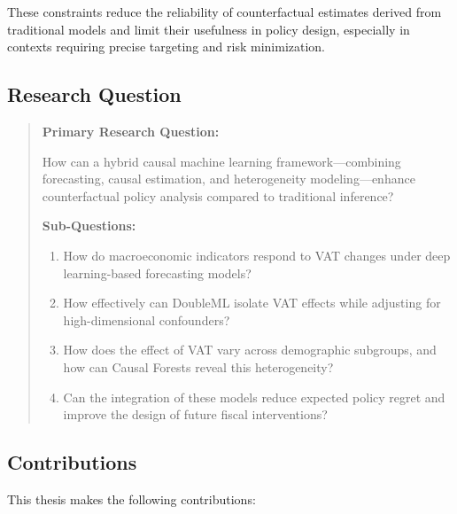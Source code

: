 These constraints reduce the reliability of counterfactual estimates derived from traditional models and limit their usefulness in policy design, especially in contexts requiring precise targeting and risk minimization.

\subsection{Research Question}\label{subsec:research_question}

\begin{quote}
\textbf{Primary Research Question:}

How can a hybrid causal machine learning framework---combining forecasting, causal estimation, and heterogeneity modeling---enhance counterfactual policy analysis compared to traditional inference?

\textbf{Sub-Questions:}

\begin{enumerate}
    \item How do macroeconomic indicators respond to VAT changes under deep learning-based forecasting models?
    \item How effectively can DoubleML isolate VAT effects while adjusting for high-dimensional confounders?
    \item How does the effect of VAT vary across demographic subgroups, and how can Causal Forests reveal this heterogeneity?
    \item Can the integration of these models reduce expected policy regret and improve the design of future fiscal interventions?
\end{enumerate}
\end{quote}

\subsection{Contributions}\label{subsec:contributions}

This thesis makes the following contributions:

